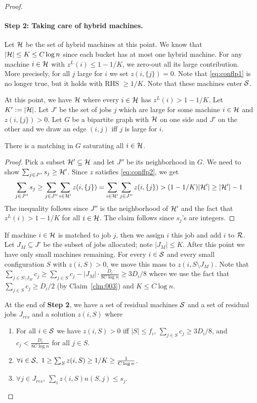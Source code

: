 \documentclass{article}[11pt]
\begin{document}
\begin{proof}
\paragraph{Step 2: Taking care of hybrid machines.} 
Let ${\cal H}$ be the set of hybrid machines at this point. We know that $|{\cal H}| \leq K \leq C\log n$ since each bucket has at most one hybrid machine.
For any machine $i\in {\cal H}$ with $z^L(i) \le 1-1/K$, we zero-out all its large contribution. More precisely, for all $j$ large for $i$ we set $z(i,\{j\})= 0$.
Note that \eqref{eq:conflp1} is no longer true, but it holds with RHS $\geq 1/K$. Note that these machines enter ${\cal S}$.

At this point, we have ${\cal H}$ where every $i\in {\cal H}$ has $z^L(i) > 1-1/K$. Let $K' := |{\cal H}|$. Let $J'$ be the set of jobs $j$ which are large for some machine $i\in {\cal H}$ and $z(i,\{j\}) > 0$.
Let $G$ be a bipartite graph with ${\cal H}$ on one side and $J'$ on the other and we draw an edge $(i,j)$ iff $j$ is large for $i$.
\begin{claim}
	There is a matching in $G$ saturating all $i\in {\cal H}$.
\end{claim}
\begin{proof}
Pick a subset ${\cal H}' \subseteq {\cal H}$ and let $J''$ be its neighborhood in $G$. We need to show $\sum_{j\in J''} s_j \geq {\cal H}'$.
Since $z$ satisfies \eqref{eq:conflp2}, we get
\[
\sum_{j\in J''} s_j \geq \sum_{j\in J''} \sum_{i\in {\cal H}'} z(i,\{j\}) = \sum_{i\in {\cal H}'} \sum_{j\in J''} z(i,\{j\})  > (1-1/K)|{\cal H}'| \geq |{\cal H}'| - 1
\]
The inequality follows since $J''$ is the neighborhood of ${\cal H}'$ and the fact that $z^L(i) > 1-1/K$ for all $i\in {\cal H}$.
The claim follows since $s_j$'s are integers.
\end{proof}
If machine $i\in {\cal H}$ is matched to job $j$, then we assign $i$ this job and add $i$ to ${\cal R}$. Let $J_M \subseteq J'$ be the subset of jobs allocated; note $|J_M| \leq K$.
After this point we have only small machines remaining. For every $i\in {\cal S}$ and every small configuration $S$ with $z(i,S) > 0$, we move this mass to $z(i,S\setminus J_M)$.
Note that $\sum_{j\in S\setminus J_M} c_j \geq  \sum_{j\in S} c_j - |J_M|\cdot \frac{D_i}{8C\log n} \geq 3D_i/8$ where we use the fact that $\sum_{j\in S} c_j \geq D_i/2$ (by Claim~\ref{clm:003}) and $K\leq C\log n$.


\begin{claim}\label{clm:007}
At the end of {\bf  Step 2}, we have a set of residual machines ${\cal S}$ and a set of residual jobs $J_{res}$  and a solution $z(i,S)$ where 
\begin{enumerate} [noitemsep]
	\item For all $i\in {\cal S}$ we have $z(i,S) > 0$ iff $|S| \leq f_i$, $\sum_{j\in S} c_j \geq 3D_i/8$, and $c_j < \frac{D_i}{8C\log n}$ for all $j\in S$.
	\item $\forall i \in {\cal S}, ~ \textstyle 1 \ge \sum_{S} z(i,S)  \geq   1/K \geq \frac{1}{C\log n}$.
	\item $\forall j\in J_{res}, ~ \textstyle \sum_{i} z(i,S)n(S,j)  \leq  s_j$.
	

\end{enumerate}
\end{claim}
\end{proof}
\end{document}
